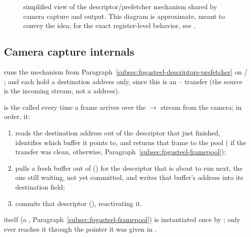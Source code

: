 \begin{figure}[htbp]
    \centering
    
    \caption[simplified view of the descriptor/prefetcher mechanism shared by camera capture and  output.]{simplified view of the descriptor/prefetcher mechanism shared by camera capture and  output. This diagram is approximate, meant to convey the idea; for the exact register-level behavior, see \cite{EP-IPUG}.}
    \label{fig:fpgasteel-descriptor-prefetcher}
\end{figure}

\subsection{Camera capture internals}
\label{subsec:fpgasteel-camera-capture-interrupt}

 runs the mechanism from Paragraph~\ref{subsec:fpgasteel-descriptors-prefetcher} on  / ;  and  each hold a destination address only, since this is an -- transfer (the source is the incoming  stream, not a  address).

 is the  called every time a frame arrives over the $\rightarrow$ stream from the camera; in order, it:
\begin{enumerate}
    \item reads the destination address out of the descriptor that just finished, identifies which  buffer it points to, and returns that frame to the pool ( if the transfer was clean,  otherwise, Paragraph~\ref{subsec:fpgasteel-framepool});
    \item pulls a fresh buffer out of  () for the descriptor that is about to run next, the one still waiting, not yet committed, and writes that buffer's address into its destination field;
    \item commits that descriptor (), reactivating it.
\end{enumerate}

 itself (a , Paragraph~\ref{subsec:fpgasteel-framepool}) is instantiated once by ;  only ever reaches it through the pointer it was given in .


